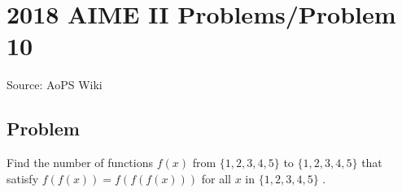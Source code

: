 \documentclass[12pt]{article}
\begin{document}
\section*{{2018 AIME II Problems/Problem 10}}
Source: AoPS Wiki

\subsection*{Problem}
Find the number of functions $f(x)$ from $\{1, 2, 3, 4, 5\}$ to $\{1, 2, 3, 4, 5\}$ that satisfy $f(f(x)) = f(f(f(x)))$ for all $x$ in $\{1, 2, 3, 4, 5\}$ .
\end{document}
